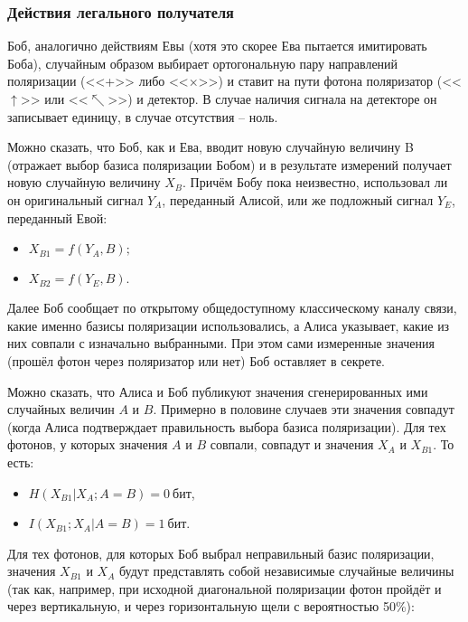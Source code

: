 \subsubsection{Действия легального получателя}

Боб, аналогично действиям Евы (хотя это скорее Ева пытается имитировать Боба), случайным образом выбирает ортогональную пару направлений поляризации (<<+>> либо <<×>>) и ставит на пути фотона поляризатор (<<$\uparrow$>> или <<$\nwarrow$>>) и детектор. В случае наличия сигнала на детекторе он записывает единицу, в случае отсутствия – ноль.

Можно сказать, что Боб, как и Ева, вводит новую случайную величину B (отражает выбор базиса поляризации Бобом) и в результате измерений получает новую случайную величину $X_B$. Причём Бобу пока неизвестно, использовал ли он оригинальный сигнал $Y_A$, переданный Алисой, или же подложный сигнал $Y_E$, переданный Евой:

\begin{itemize}
	\item $X_{B1} = f \left( Y_A, B \right);$
	\item $X_{B2} = f \left( Y_E, B \right).$
\end{itemize}

Далее Боб сообщает по открытому общедоступному классическому каналу связи, какие именно базисы поляризации использовались, а Алиса указывает, какие из них совпали с изначально выбранными. При этом сами измеренные значения (прошёл фотон через поляризатор или нет) Боб оставляет в секрете.

Можно сказать, что Алиса и Боб публикуют значения сгенерированных ими случайных величин $A$ и $B$. Примерно в половине случаев эти значения совпадут (когда Алиса подтверждает правильность выбора базиса поляризации). Для тех фотонов, у которых значения $A$ и $B$ совпали, совпадут и значения $X_A$ и $X_{B1}$. То есть:

\begin{itemize}
	\item $H \left( X_{B1} | X_A; A = B \right) = 0~\text{бит}$,
	\item $I \left( X_{B1} ; X_A | A = B \right) = 1~\text{бит}$.
\end{itemize}

Для тех фотонов, для которых Боб выбрал неправильный базис поляризации, значения $X_{B1}$ и $X_{A}$ будут представлять собой независимые случайные величины (так как, например, при исходной диагональной поляризации фотон пройдёт и через вертикальную, и через горизонтальную щели с вероятностью 50\%):

